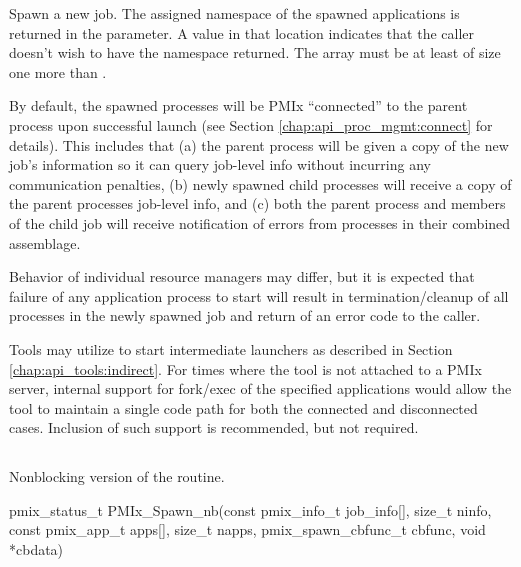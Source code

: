\optattrend

\descr

Spawn a new job.
The assigned namespace of the spawned applications is returned in the  parameter.
A  value in that location indicates that the caller doesn't wish to have the namespace returned.
The  array must be at least of size one more than .

By default, the spawned processes will be PMIx ``connected'' to the parent process upon successful launch (see Section \ref{chap:api_proc_mgmt:connect}
for details). This includes that (a) the parent process will be given a copy of the new job's
information so it can query job-level info without incurring any communication penalties, (b) newly spawned child processes will receive a copy of the parent processes job-level info, and (c) both the parent process and members of the child job will receive notification of errors from processes in their combined assemblage.

\adviceuserstart
Behavior of individual resource managers may differ, but it is expected that failure of any application process to start will result in termination/cleanup of all processes in the newly spawned job and return of an error code to the caller.
\adviceuserend

\adviceimplstart
Tools may utilize  to start intermediate launchers as described in Section \ref{chap:api_tools:indirect}. For times where the tool is not attached to a \ac{PMIx} server, internal support for fork/exec of the specified applications would allow the tool to maintain a single code path for both the connected and disconnected cases. Inclusion of such support is recommended, but not required.
\adviceimplend


\subsection{}

\summary

Nonblocking version of the  routine.

\format

\cspecificstart
\begin{codepar}
pmix_status_t
PMIx_Spawn_nb(const pmix_info_t job_info[], size_t ninfo,
              const pmix_app_t apps[], size_t napps,
              pmix_spawn_cbfunc_t cbfunc, void *cbdata)
\end{codepar}
\cspecificend

